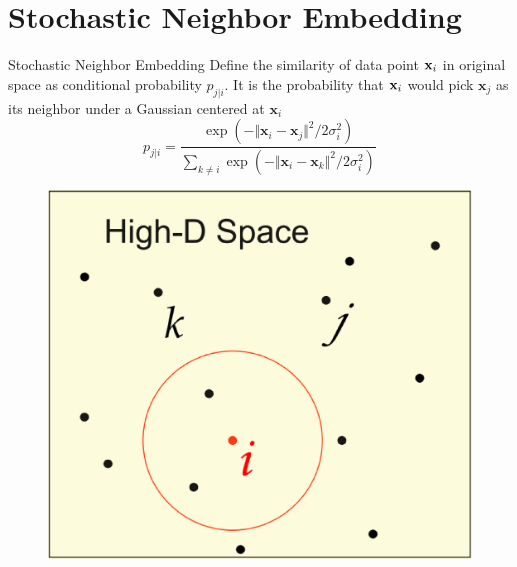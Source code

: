 \documentclass[10pt]{beamer}
\newcommand{\bol}[1]{\textbf{#1}}
\begin{document}
\section{Stochastic Neighbor Embedding}
\begin{frame}{Stochastic Neighbor Embedding}
Define the similarity of data point $\bold{x}_i$ in original space as conditional probability $p_{j|i}$. It is the probability that $\bold{x}_i$ would pick $\bol{x}_j$ as its neighbor under a Gaussian centered at $\bol{x}_i$
\begin{displaymath}
	p_{j|i} = \frac{\exp{(-\Vert\bol{x}_i - \bol{x}_j\Vert^2 / 2\sigma_i^2)}}{\sum_{k \neq i}\exp(-\Vert\bol{x}_i - \bol{x}_k\Vert^2 / 2\sigma_i^2)}
\end{displaymath}
\begin{figure}
\centering
\includegraphics[scale=0.2]{./image/hd.eps}
\end{figure}
\end{frame}
\end{document}
